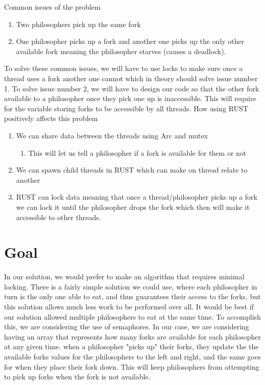 \documentclass[conference]{IEEEtran}
\begin{document}
	 Common issues of the problem
	 \begin{enumerate}
	 	\item Two philosophers pick up the same fork
	 	\item One philosopher picks up a fork and another one picks up the only other available fork meaning the philosopher starves (causes a deadlock).
	 \end{enumerate}
	 To solve these common issues, we will have to use locks to make sure once a thread uses a fork another one cannot which in theory should solve issue number 1. To solve issue number 2, we will have to design our code so that the other fork available to a philosopher once they pick one up is inaccessible. This will require for the variable storing forks to be accessible by all threads.
	 \linebreak
	 How using RUST positively affects this problem
	 \begin{enumerate}
	 	\item We can share data between the threads using Arc and mutex
	 	\begin{enumerate}
	 		
	 		\item This will let us tell a philosopher if a fork is available for them or not
	 	\end{enumerate}
	 	\item We can spawn child threads in RUST which can make on thread relate to another
	 	\item RUST can lock data meaning that once a thread/philosopher picks up a fork we can lock it until the philosopher drops the fork which then will make it accessible to other threads.

	\end{enumerate}
	 \section{Goal}
		In our solution, we would prefer to make an algorithm that requires minimal locking. There is a fairly simple solution we could use, where each philosopher in turn is the only one able to eat, and thus guarantees their access to the forks, but this solution allows much less work to be performed over all. It would be best if our solution allowed multiple philosophers to eat at the same time. To accomplish this, we are considering the use of semaphores. In our case, we are considering having an array that represents how many forks are available for each philosopher at any given time. when a philosopher "picks up" their forks, they update the the available forks values for the philosophers to the left and right, and the same goes for when they place their fork down. This will keep philosophers from attempting to pick up forks when the fork is not available. 
	\linebreak
	
	
\end{document}
